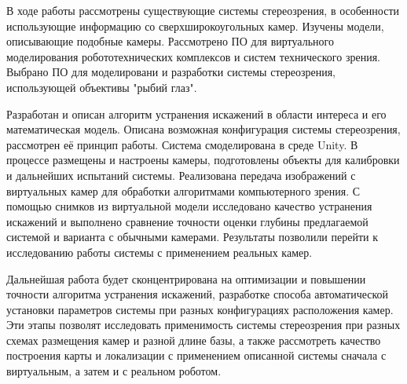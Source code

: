 
В ходе работы рассмотрены существующие системы стереозрения, в особенности использующие информацию
со сверхширокоугольных камер. Изучены модели, описывающие подобные камеры. Рассмотрено ПО для виртуального
 моделирования робототехнических комплексов и систем технического зрения. Выбрано ПО для моделировани и 
разработки системы стереозрения, использующей объективы "рыбий глаз". 

Разработан и описан алгоритм устранения искажений в области интереса и его математическая модель.   %
Описана возможная конфигурация системы стереозрения, рассмотрен её принцип работы. Система 
 смоделирована в среде Unity. В процессе размещены и настроены камеры, подготовлены объекты для калибровки и 
дальнейших испытаний системы. Реализована передача изображений с виртуальных камер для обработки алгоритмами
компьютерного зрения. С помощью снимков из виртуальной модели исследовано качество устранения искажений и выполнено
 сравнение точности оценки глубины предлагаемой системой и варианта с обычными камерами. Результаты позволили 
 перейти к исследованию работы системы с применением реальных камер.  

Дальнейшая работа будет сконцентрирована на оптимизации и повышении точности алгоритма устранения искажений,
разработке способа автоматической установки параметров системы при разных конфигурациях расположения камер. 
Эти этапы позволят исследовать применимость системы стереозрения при  разных схемах размещения камер и разной 
длине базы, а также рассмотреть качество построения карты и локализации с применением описанной 
системы сначала с виртуальным, а затем и с реальном роботом.  